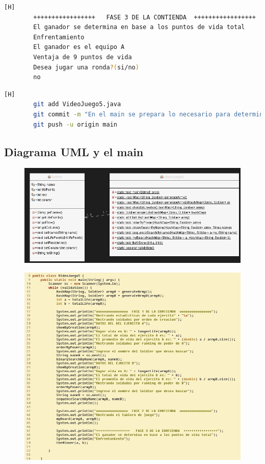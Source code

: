 \documentclass{article}
\begin{document}
\begin{lstlisting}[language=bash,caption={Compilando y probando el codigo en su versión final }][H]
		+++++++++++++++++   FASE 3 DE LA CONTIENDA  +++++++++++++++++
		El ganador se determina en base a los puntos de vida total
		Enfrentamiento
		El ganador es el equipo A
		Ventaja de 9 puntos de vida
		Desea jugar una ronda?(si/no)
		no
	\end{lstlisting}
	
	
	\begin{lstlisting}[language=bash,caption={Commit: 4343ad638f404dafc97349ff35c8808998ea0f1b}][H]
		git add VideoJuego5.java
		git commit -m "En el main se prepara lo necesario para determinar al ganador"			
		git push -u origin main
	\end{lstlisting}
	
	\subsection{Diagrama UML y el main}
	
	\begin{figure}[H]
		\centering
		\includegraphics[width=1\textwidth,keepaspectratio]{img/uml.png}
	\end{figure}
	
	\begin{figure}[H]
		\centering
		\includegraphics[width=1\textwidth,keepaspectratio]{img/main.jpg}
	\end{figure}
	
\end{document}
